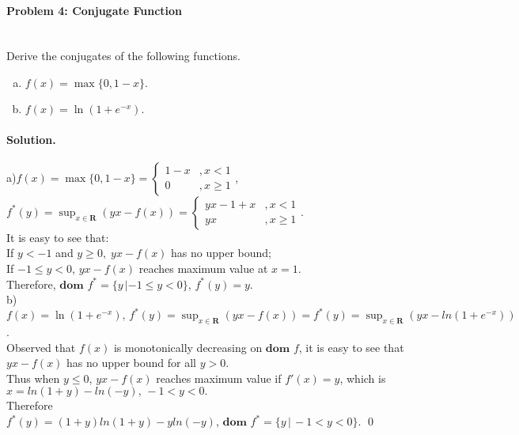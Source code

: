 \documentclass[a4paper]{article}
\newenvironment{solution}
{\color{blue} \paragraph{Solution.\\}}
{\newline \qed}
\begin{document}
\paragraph{Problem 4: Conjugate Function}
~\\
Derive the conjugates of the following functions.
\begin{enumerate}[a)]
    \item $f(x)=\max\{0,1-x\}.$
    \item $f(x)=\ln(1+e^{-x}).$
\end{enumerate}
\begin{solution}
a)\;$f(x)=\max\{0,1-x\}=
\begin{cases}
1-x &,{x<1}\\
0 &,{x\geq 1}
\end{cases}$, \quad 
$f^*(y)=\sup_{x\in\mathbf{R}}(yx-f(x))=
\begin{cases}
yx-1+x &,{x<1}\\
yx &,{x\geq 1}
\end{cases}$.\\It is easy to see that: \\If $y<-1$ and $y\geq 0,\;yx-f(x)$ has no upper bound;\\If $-1\leq y<0$, $yx-f(x)$ reaches maximum value at $x=1$.\\ Therefore, $\textbf{dom }f^*=\{y\,|-1\leq y<0\},\,f^*(y)=y$. 
\\b)\;$f(x)=\ln(1+e^{-x}),\,f^*(y)=\sup_{x\in\mathbf{R}}(yx-f(x))=f^*(y)=\sup_{x\in\mathbf{R}}(yx-ln(1+e^{-x}))$.\\Observed that $f(x)$ is monotonically decreasing on $\textbf{dom } f$, it is easy to see that $yx-f(x)$ has no upper bound for all $y>0$. \\Thus when $y\leq 0$, $yx-f(x)$ reaches maximum value if $f'(x)=y$, which is $x=ln(1+y)-ln(-y),\,-1<y<0.$\\Therefore $f^*(y)=(1+y)ln(1+y)-yln(-y),\,\textbf{dom }f^*=\{y\,|\,-1<y<0\}$.
\end{solution}
\end{document}
